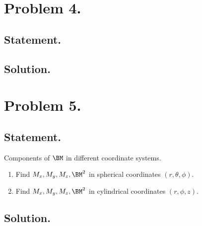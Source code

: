 \section{Problem 4.}
\subsection{Statement.}
\subsection{Solution.}
\section{Problem 5.}
\subsection{Statement.}

Components of $\BM$ in different coordinate systems.

\begin{enumerate}
\item Find $M_x, M_y, M_z, \BM^2$ in spherical coordinates $(r, \theta, \phi)$.
\item Find $M_x, M_y, M_z, \BM^2$ in cylindrical coordinates $(r, \phi, z)$.
\end{enumerate}


\subsection{Solution.}

\EndNoBibArticle
